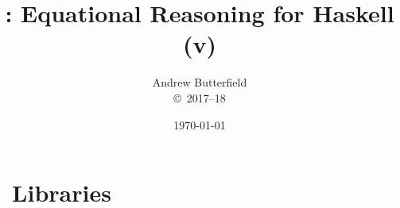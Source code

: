 \documentclass[fleqn,10pt]{report}
\author{
Andrew Butterfield
\\
{\small \copyright\ 2017--18}
}
\title{
  \reasonH: Equational Reasoning for Haskell
  \\(v\hreqVersion)
}
\date{
\today
}
\begin{document}
\maketitle
\tableofcontents

%
% 


\chapter{\reasonH\ Libraries}


\newpage

\newpage

\newpage

\newpage

\end{document}
